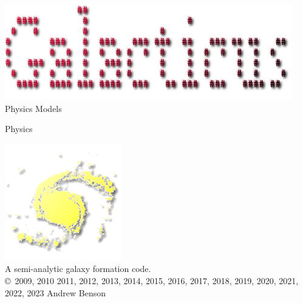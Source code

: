 \documentclass[letterpaper,10pt,headsepline]{scrbook}
\newcommand{\docname}{Physics}
\begin{document}
\lstset{language=[95]Fortran}

\frontmatter

\pagestyle{empty}
\begin{center}
\includegraphics[width=125mm]{GalacticusLogo.png}\\

\Huge Physics Models \normalsize

\docname

\includegraphics{New_Logo_Galaxy_192_Transparent.png}\\
A semi-analytic galaxy formation code.\\

\copyright\ 2009, 2010 2011, 2012, 2013, 2014, 2015, 2016, 2017, 2018, 2019, 2020, 2021, 2022, 2023 Andrew Benson
\end{center}

\tableofcontents

\mainmatter
\pagestyle{headings}







\backmatter




\printglossaries

\citeindextrue
\printindex
\end{document}
